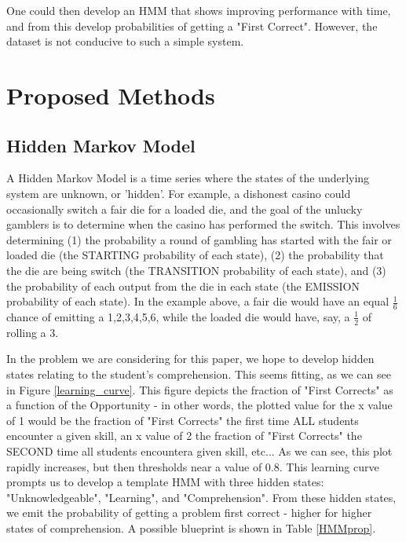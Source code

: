 \documentclass{article} %
\begin{document}
One could then develop an HMM that shows improving performance with time, and from this develop probabilities of getting a "First Correct". However, the dataset is not conducive to such a simple system.

\section{Proposed Methods}

\subsection{Hidden Markov Model}

A Hidden Markov Model is a time series where the states of the underlying system are unknown, or 'hidden'. For example, a dishonest casino could occasionally switch a fair die for a loaded die, and the goal of the unlucky gamblers is to determine when the casino has performed the switch. This involves determining (1) the probability a round of gambling has started with the fair or loaded die (the STARTING probability of each state), (2) the probability that the die are being switch (the TRANSITION probability of each state), and (3) the probability of each output from the die in each state (the EMISSION probability of each state). In the example above, a fair die would have an equal $\frac{1}{6}$ chance of emitting a 1,2,3,4,5,6, while the loaded die would have, say, a $\frac{1}{2}$ of rolling a 3.

In the problem we are considering for this paper, we hope to develop hidden states relating to the student's comprehension. This seems fitting, as we can see in Figure \ref{learning_curve}. This figure depicts the fraction of "First Corrects" as a function of the Opportunity - in other words, the plotted value for the x value of 1 would be the fraction of "First Corrects" the first time ALL students encounter a given skill, an x value of 2 the fraction of "First Corrects" the SECOND time all students encountera given skill, etc... As we can see, this plot rapidly increases, but then thresholds near a value of 0.8. This learning curve prompts us to develop a template HMM with three hidden states: "Unknowledgeable", "Learning", and "Comprehension". From these hidden states, we emit the probability of getting a problem first correct - higher for higher states of comprehension. A possible blueprint is shown in Table \ref{HMMprop}.
\end{document}
